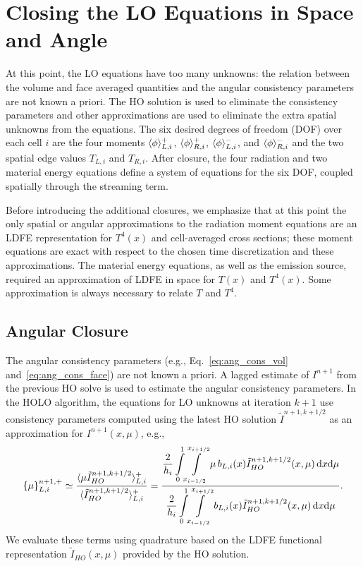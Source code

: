\section{Closing the LO Equations in Space and Angle}
\label{sec:closure}

At this point, the LO equations have too many unknowns: the relation between the volume
and face averaged quantities and the angular consistency parameters are not known a
priori. The HO solution is used to eliminate the consistency parameters and other
approximations are used to eliminate the extra spatial unknowns from the equations.  
The six desired degrees of freedom (DOF) over each cell $i$ are the four moments $\langle \phi \rangle_{L,i}^+$,
$\langle \phi \rangle_{R,i}^+$, $\langle \phi \rangle_{L,i}^-$, and $\langle \phi \rangle_{R,i}^-$ and the two
spatial edge values $T_{L,i}$ and $T_{R,i}$.  After closure, the four radiation and two material
energy equations define a system of equations for the six DOF, coupled spatially through
the streaming term.  

Before introducing the additional closures, we emphasize that at this point the only spatial or
angular approximations to the radiation  moment equations are an LDFE
representation for $T^4(x)$ and cell-averaged cross sections; these moment equations are exact with
respect to the chosen time discretization and these approximations.  The material energy
equations, as well as the emission source, required an approximation of LDFE in space for $T(x)$ and $T^4(x)$.  Some
approximation is always necessary
to relate $T$ and $T^4$.

\subsection{Angular Closure}

The angular consistency
parameters (e.g., Eq.~\eqref{eq:ang_cons_vol} and~\eqref{eq:ang_cons_face}) are not known a priori. 
A lagged estimate of $I^{n+1}$ from the previous HO solve is
used to estimate the angular consistency parameters. In the HOLO algorithm, the equations for LO unknowns at iteration $k+1$ use consistency parameters
computed using the latest HO solution $\tilde{I}^{n+1,k+1/2}$
as an approximation for $I^{n+1}(x,\mu)$, e.g.,
\begin{equation}\label{eq:ang_cons_vol1}
    \left\{ {\mu} \right\}_{L,i}^{n+1,+} \simeq \frac{\langle \mu
    \tilde I_{HO}^{n+1,k+1/2} \rangle_{L,i}^+}{\displaystyle \langle \tilde I_{HO}^{n+1,k+1/2} \rangle_{L,i}^+} =
    \frac{\displaystyle 
{\displaystyle \frac{2}{h_i}} \int\limits_0^1 \!\int\limits_{x_{i-1/2}}^{x_{i+1/2}} \mu \, b_{L,i}(x)
\tilde I^{n+1,k+1/2}_{HO}(x,\mu)\, \mathrm{d} x \mathrm{d} \mu } 
{\displaystyle {\displaystyle \frac{2}{h_i}} \int\limits_0^1 \!\int\limits_{x_{i-1/2}}^{x_{i+1/2}}  b_{L,i}(x)
\tilde I^{n+1,k+1/2}_{HO}(x,\mu)\, \mathrm{d} x \mathrm{d} \mu } .
\end{equation}
We evaluate these terms using quadrature based
on the LDFE functional representation $\tilde I_{HO}(x,\mu)$ provided by the HO solution.

